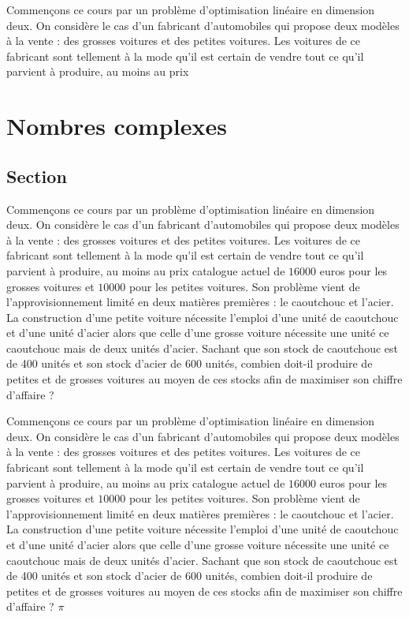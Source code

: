 \documentclass[a4paper, 11pt,openany]{book}%
\newtheorem[L]{thm}{Théorème}[section]
\newtheorem[M]{propo}[thm]{Proposition}
\newtheorem[M]{prop}[thm]{Propriété}
\newtheorem[M]{coro}[thm]{Corollaire}
\newtheorem[M]{lem}[thm]{Lemme}
\newtheorem[M,bodystyle=]{defi}[thm]{Définition}
\newtheorem[M,bodystyle=]{remark}[thm]{Remarque}
\newtheorem[M,bodystyle=]{met}[thm]{Méthode}
\newtheorem[M,bodystyle=]{ret}[thm]{A retenir}
\newtheorem[M,bodystyle=]{idee}[thm]{Idée}
\newtheorem[style=S,underline=false,bodystyle=]{exem}[thm]{Exemple}
\newtheorem[S,underline=false,bodystyle=]{exo}[thm]{Exercice}
\newtheorem[S,underline=false,bodystyle=]{appli}[thm]{Application}
\newtheorem[S,underline=false,bodystyle=]{sol}[thm]{Solution}
\newtheorem[S,underline=false,bodystyle=]{hypo}[thm]{Hypothesis}
\newtheorem[S,underline=false,bodystyle=]{nota}[thm]{Notation}
\begin{document}
      

         Commençons ce cours par un problème d'optimisation linéaire en dimension deux. On considère le cas d'un fabricant d'automobiles qui propose deux modèles à la vente : des grosses voitures et des petites voitures. Les voitures de ce fabricant sont tellement à la mode qu'il est certain de vendre tout ce qu'il parvient à produire, au moins au prix 

    

   

\mainmatter

   \chapter{Nombres complexes}

      \section{Section}

         Commençons ce cours par un problème d'optimisation linéaire en dimension deux. On considère le cas d'un fabricant d'automobiles qui propose deux modèles à la vente : des grosses voitures et des petites voitures. Les voitures de ce fabricant sont tellement à la mode qu'il est certain de vendre tout ce qu'il parvient à produire, au moins au prix catalogue actuel de $16000$ euros pour les grosses voitures et $10000$ pour les petites voitures. Son problème vient de l'approvisionnement limité en deux matières premières : le caoutchouc et l'acier. La construction d'une petite voiture nécessite l'emploi d'une unité de caoutchouc et d'une unité d'acier alors que celle d'une grosse voiture nécessite une unité ce caoutchouc mais de deux unités d'acier. Sachant que son stock de caoutchouc est de 400 unités et son stock d'acier de 600 unités, combien doit-il produire de petites et de grosses voitures au moyen de ces stocks afin de maximiser son chiffre d'affaire ?

         

                  Commençons ce cours par un problème d'optimisation linéaire en dimension deux. On considère le cas d'un fabricant d'automobiles qui propose deux modèles à la vente : des grosses voitures et des petites voitures. Les voitures de ce fabricant sont tellement à la mode qu'il est certain de vendre tout ce qu'il parvient à produire, au moins au prix catalogue actuel de $16000$ euros pour les grosses voitures et $10000$ pour les petites voitures. Son problème vient de l'approvisionnement limité en deux matières premières : le caoutchouc et l'acier. La construction d'une petite voiture nécessite l'emploi d'une unité de caoutchouc et d'une unité d'acier alors que celle d'une grosse voiture nécessite une unité ce caoutchouc mais de deux unités d'acier. Sachant que son stock de caoutchouc est de 400 unités et son stock d'acier de 600 unités, combien doit-il produire de petites et de grosses voitures au moyen de ces stocks afin de maximiser son chiffre d'affaire ? $\pi$
\end{document}
